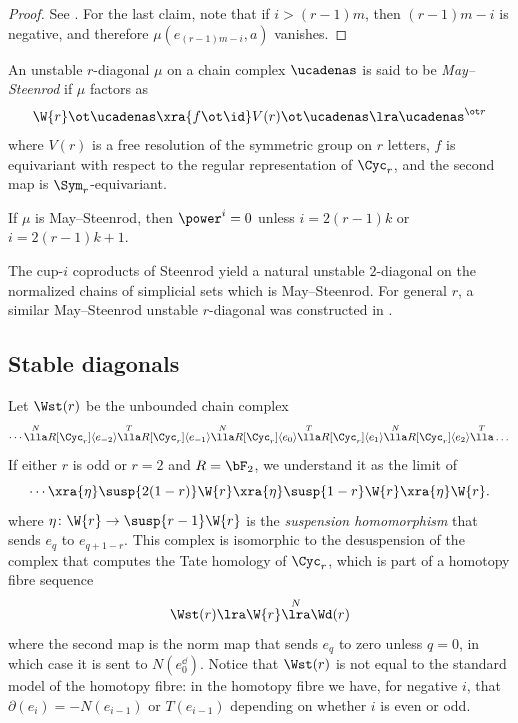 \begin{proof}
	See \cite{may1970general}. For the last claim, note that if $i>(r-1)m$, then $(r-1)m-i$ is negative, and therefore $\mu(e_{(r-1)m-i},a)$ vanishes.
\end{proof}

\begin{definition}
	An unstable $r$-diagonal $\mu$ on a chain complex $\ucadenas$ is said to be \emph{May--Steenrod} if $\mu$ factors as
	\[
	\W{r} \ot \ucadenas \xra{f \ot \id} V(r) \ot \ucadenas \lra \ucadenas^{\ot r}
	\]
	where $V(r)$ is a free resolution of the symmetric group on $r$ letters, $f$ is equivariant with respect to the regular representation of $\Cyc_r$, and the second map is $\Sym_r$-equivariant.
\end{definition}

\begin{remark}
	If $\mu$ is May--Steenrod, then $\power^i = 0$ unless $i = 2(r-1)k$ or $i = 2(r-1)k+1$.
\end{remark}

\begin{example}
	The cup-$i$ coproducts of Steenrod \cite{steenrod1947products, medina2022axiomatic} yield a natural unstable $2$-diagonal on the normalized chains of simplicial sets which is May--Steenrod.
	For general $r$, a similar May--Steenrod unstable $r$-diagonal was constructed in \cite{medina2021may_st}.
\end{example}

\subsection{Stable diagonals}\label{s:stable}

Let $\Wst(r)$ be the unbounded chain complex
\[
\dotsb \overset{N}{\lla} R[\Cyc_r]\langle e_{-2}\rangle
\overset{T}{\lla}
R[\Cyc_r]\langle e_{-1}\rangle
\overset{N}{\lla}
R[\Cyc_r]\langle e_0\rangle
\overset{T}{\lla}
R[\Cyc_r]\langle e_{1}\rangle
\overset{N}{\lla}
R[\Cyc_r]\langle e_{2}\rangle
\overset{T}{\lla}
\dots
\]
If either $r$ is odd or $r=2$ and $R=\bF_2$, we understand it as the limit of
\[
\dotsb \xra{\eta} \susp{2(1-r)}\W{r} \xra{\eta} \susp{1-r} \W{r} \xra{\eta} \W{r}.
\]
where $\eta \colon \W{r} \to \susp{r-1}\W{r}$ is the \emph{suspension homomorphism} that sends $e_{q}$ to $e_{q+1-r}$. This complex is isomorphic to the desuspension of the complex that computes the Tate homology of $\Cyc_r$, which is part of a homotopy fibre sequence %
\[
\Wst(r) \lra \W{r}\overset{N}{\lra} \Wd(r)
\]
where the second map is the norm map that sends $e_q$ to zero unless $q=0$, in which case it is sent to $N(e_0^\dd)$.
Notice that $\Wst(r)$ is not equal to the standard model of the homotopy fibre: in the homotopy fibre we have, for negative $i$, that $\partial(e_i) = -N(e_{i-1})$ or $T(e_{i-1})$ depending on whether $i$ is even or odd.

